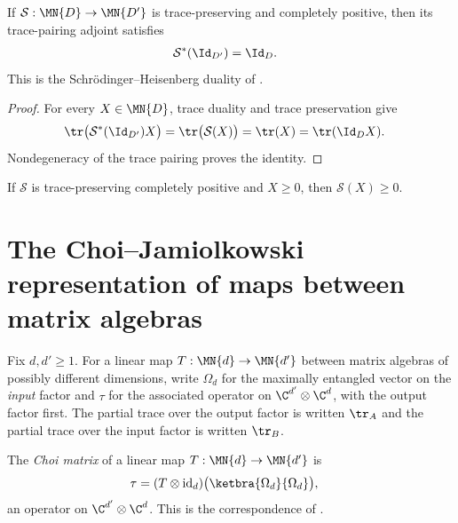 \begin{theorem}
    \label{thm:is_kraus_cptp_trace_adjoint_one}
    \leanok
    If $\mathcal S:\MN{D}\to\MN{D'}$ is trace-preserving and completely
    positive, then its trace-pairing adjoint satisfies
    \begin{align}
        \mathcal S^*(\Id_{D'})
        &=\Id_D.
        \notag
    \end{align}
    This is the Schrödinger--Heisenberg duality of
    \cite[Section~1.2]{Wolf2012Quantum}.
\end{theorem}

\begin{proof}
    \leanok
    For every $X\in\MN{D}$, trace duality and trace preservation give
    \begin{align}
        \tr\bigl(\mathcal S^*(\Id_{D'})X\bigr)
        &=\tr\bigl(\mathcal S(X)\bigr)
        =\tr(X)
        =\tr(\Id_DX).
        \notag
    \end{align}
    Nondegeneracy of the trace pairing proves the identity.
\end{proof}

\begin{lemma}
    \label{lem:is_kraus_cptp_map_pos}
    \leanok
    If $\mathcal S$ is trace-preserving completely positive and $X\geq0$, then
    $\mathcal S(X)\geq0$.
\end{lemma}

\section{The Choi--Jamiolkowski representation of maps between matrix algebras}

Fix $d,d'\geq 1$. For a linear map $T:\MN{d}\to\MN{d'}$ between matrix
algebras of possibly different dimensions, write $\Omega_d$ for the maximally
entangled vector on the \emph{input} factor and $\tau$ for the associated
operator on $\C^{d'}\otimes\C^{d}$, with the output factor first. The partial
trace over the output factor is written $\tr_A$ and the partial trace over
the input factor is written $\tr_B$.

\begin{definition}
    \label{def:choi_matrix_rect}
    \leanok
    The \emph{Choi matrix} of a linear map $T:\MN{d}\to\MN{d'}$ is
    \begin{align}
        \tau &= (T\otimes\operatorname{id}_d)
          \bigl(\ketbra{\Omega_d}{\Omega_d}\bigr),
        \notag
    \end{align}
    an operator on $\C^{d'}\otimes\C^{d}$. This is the correspondence of
    \cite[Proposition~2.1]{Wolf2012Quantum}.
\end{definition}

